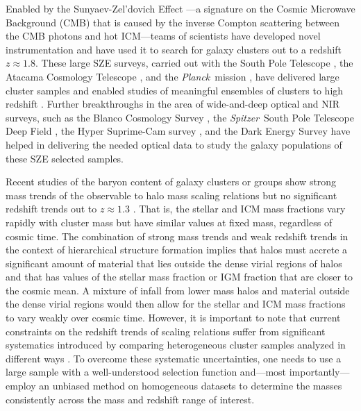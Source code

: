 \documentclass[useAMS,usenatbib,iop,numberedappendix]{mn2e}
\newcommand{\redshift}{\ensuremath{z}}
\newcommand{\Spitzer}{\emph{Spitzer}}
\newcommand{\PLANCK}{\emph{Planck}}
\begin{document}
Enabled by the Sunyaev-Zel'dovich Effect \citep[SZE;][]{sunyaev70b,sunyaev72}---a signature on the Cosmic Microwave Background (CMB) that is caused by the inverse Compton scattering between the CMB photons and hot ICM---teams of scientists have developed novel instrumentation and have used it to search for galaxy clusters out to a redshift $z\approx1.8$.   These large SZE surveys, carried out with the South Pole Telescope \citep[SPT;][]{carlstrom11}, the Atacama Cosmology Telescope \citep{fowler07}, and the \PLANCK\ mission \citep{planck06}, have delivered large cluster samples and enabled studies of meaningful ensembles of clusters to high redshift \citep{high10,menanteau10b,andersson11,planck11_stat_sr,semler12,sifon13,mcdonald13,mcdonald16b}. 
Further breakthroughs in the area of wide-and-deep optical and NIR surveys, such as the Blanco Cosmology Survey \citep[][]{desai12}, the \Spitzer\ South Pole Telescope Deep Field \citep{ashby13a}, the Hyper Suprime-Cam survey \citep[][]{miyazaki12,aihara17}, and the Dark Energy Survey \citep[DES;][]{DES05,des2016morethande} have helped in delivering the needed optical data to study the galaxy populations of these SZE selected samples.

Recent studies of the baryon content of galaxy clusters or groups show strong mass trends of the observable to halo mass scaling relations but no significant redshift trends out to $\redshift\approx1.3$ \citep{chiu16a, chiu16c}.  That is, the stellar and ICM mass fractions vary rapidly with cluster mass but have similar values at fixed mass, regardless of cosmic time.  The combination of strong mass trends and weak redshift trends in the context of hierarchical structure formation implies that halos must accrete a significant amount of material that lies outside the dense virial regions of halos and that has values of the stellar mass fraction or IGM fraction that are closer to the cosmic mean.  A mixture of infall from 
lower mass halos and material outside the 
dense virial regions
would then allow for the stellar and ICM mass fractions to vary 
weakly over cosmic time.
However, it is important to note that current constraints on the redshift trends of scaling relations suffer from significant systematics introduced by comparing heterogeneous cluster samples analyzed in different ways \citep{chiu16a}. 
To overcome these systematic uncertainties, one needs to use a large sample with a well-understood selection function and---most importantly---employ an unbiased method on homogeneous datasets to determine the masses consistently across the mass and redshift range of interest.
\end{document}
